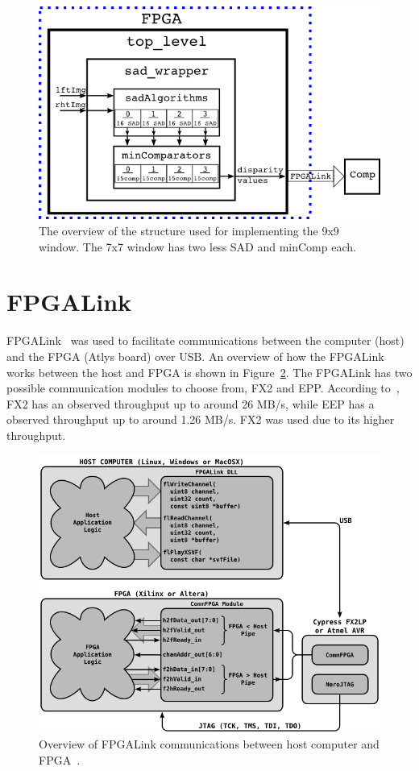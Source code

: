 \begin{figure}[h]
	\begin{center}
		\includegraphics[width=150mm]{figures/top_level_rtl.png}
		\captionfonts
		\caption{The overview of the structure used for implementing the 9x9 window. The 7x7 window has two less SAD and minComp each.}
		\label{fig:topLevel_rtl}
	\end{center}
\end{figure}

\section{FPGALink}
\label{sec:fpgalink}

FPGALink~\cite{fpgalink} was used to facilitate communications between the computer (host) and the FPGA (Atlys board) over USB. An overview of how the FPGALink works between the host and FPGA is shown in Figure~\ref{fig:fpgalink}. The FPGALink has two possible communication modules to choose from, FX2 and EPP. According to~\cite{fpgalink}, FX2 has an observed throughput up to around 26 MB/s, while EEP has a observed throughput up to around 1.26 MB/s. FX2 was used due to its higher throughput.

\begin{figure}[h]
	\begin{center}
		\includegraphics[width=150mm]{figures/fpgalinkOverview.png}
		\captionfonts
		\caption{Overview of FPGALink communications between host computer and FPGA~\cite{fpgalink}.}
		\label{fig:fpgalink}
	\end{center}
\end{figure}
